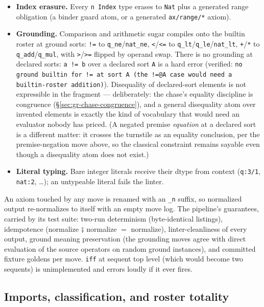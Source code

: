 \begin{itemize}
\item \textbf{Index erasure.} Every \texttt{n Index} type erases to
\texttt{Nat} plus a generated range obligation (a binder guard atom,
or a generated \texttt{ax/range/*} axiom).
\item \textbf{Grounding.} Comparison and arithmetic sugar compiles
onto the builtin roster at ground sorts: \texttt{!=} to
\texttt{q\_ne}/\texttt{nat\_ne}, \texttt{<}/\texttt{<=} to
\texttt{q\_lt}/\texttt{q\_le}/\texttt{nat\_lt}, \texttt{+}/\texttt{*}
to \texttt{q\_add}/\texttt{q\_mul}, with \texttt{>}/\texttt{>=}
flipped by operand swap. There is no grounding at declared sorts:
\texttt{a != b} over a declared sort \texttt{A} is a hard error
(verified: \texttt{no ground builtin for != at sort A (the !=@A case
would need a builtin-roster addition)}). Disequality of declared-sort
elements is not expressible in the fragment — deliberately: the
chase's equality discipline is congruence
(\S\ref{sec:gr-chase-congruence}), and a general disequality atom
over invented elements is exactly the kind of vocabulary that would
need an evaluator nobody has priced. (A negated premise
\emph{equation} at a declared sort is a different matter: it crosses
the turnstile as an equality conclusion, per the premise-negation
move above, so the classical constraint remains sayable even though
a disequality atom does not exist.)
\item \textbf{Literal typing.} Bare integer literals receive their
dtype from context (\texttt{q:3/1}, \texttt{nat:2}, …); an
untypeable literal fails the linter.
\end{itemize}

\noindent An axiom touched by any move is renamed with an
\texttt{\_n} suffix, so normalized output re-normalizes to itself
with an empty move log. The pipeline's guarantees, carried by its
test suite: two-run determinism (byte-identical listings),
idempotence (normalize $\fatsemi$ normalize $=$ normalize),
linter-cleanliness of every output, ground meaning preservation (the
grounding moves agree with direct evaluation of the source operators
on random ground instances), and committed fixture goldens per move.
\texttt{iff} at sequent top level (which would become two sequents)
is unimplemented and errors loudly if it ever fires.

\subsection{Imports, classification, and roster totality}
\label{sec:gr-registry}

